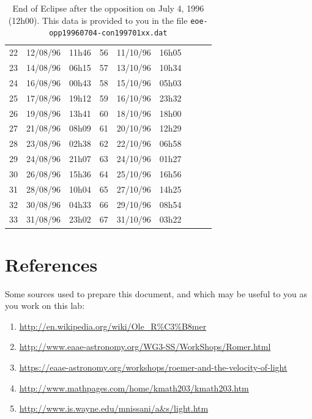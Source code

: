 \documentclass{tufte-handout}
\begin{document}
\begin{table}
\begin{tabular}{lll|lll|lll}
22 & 12/08/96 & 11h46 & 56 & 11/10/96 & 16h05 & & &\\
23 & 14/08/96 & 06h15 & 57 & 13/10/96 & 10h34 & & &\\
24 & 16/08/96 & 00h43 & 58 & 15/10/96 & 05h03 & & &\\
25 & 17/08/96 & 19h12 & 59 & 16/10/96 & 23h32 & & &\\
26 & 19/08/96 & 13h41 & 60 & 18/10/96 & 18h00 & & &\\
27 & 21/08/96 & 08h09 & 61 & 20/10/96 & 12h29 & & &\\
28 & 23/08/96 & 02h38 & 62 & 22/10/96 & 06h58 & & &\\
29 & 24/08/96 & 21h07 & 63 & 24/10/96 & 01h27 & & &\\
30 & 26/08/96 & 15h36 & 64 & 25/10/96 & 16h56 & & &\\
31 & 28/08/96 & 10h04 & 65 & 27/10/96 & 14h25 & & &\\
32 & 30/08/96 & 04h33 & 66 & 29/10/96 & 08h54 & & &\\
33 & 31/08/96 & 23h02 & 67 & 31/10/96 & 03h22 & & &\\
\end{tabular}
\caption{End of Eclipse after the opposition on July 4, 1996 (12h00). This data is provided to you in the file {\tt eoe-opp19960704-con199701xx.dat}}
\end{table}

\section{References}

Some sources used to prepare this document, and which may be useful to you as you work on this lab:

\begin{enumerate}[itemsep=0pt,parsep=0pt,topsep=0pt,partopsep=0pt]
\item \url{http://en.wikipedia.org/wiki/Ole_R%C3%B8mer}
\item \url{http://www.eaae-astronomy.org/WG3-SS/WorkShops/Romer.html}
\item \url{https://eaae-astronomy.org/workshops/roemer-and-the-velocity-of-light}
\item \url{http://www.mathpages.com/home/kmath203/kmath203.htm}
\item \url{http://www.is.wayne.edu/mnissani/a&s/light.htm}
\end{enumerate}
\end{document}
